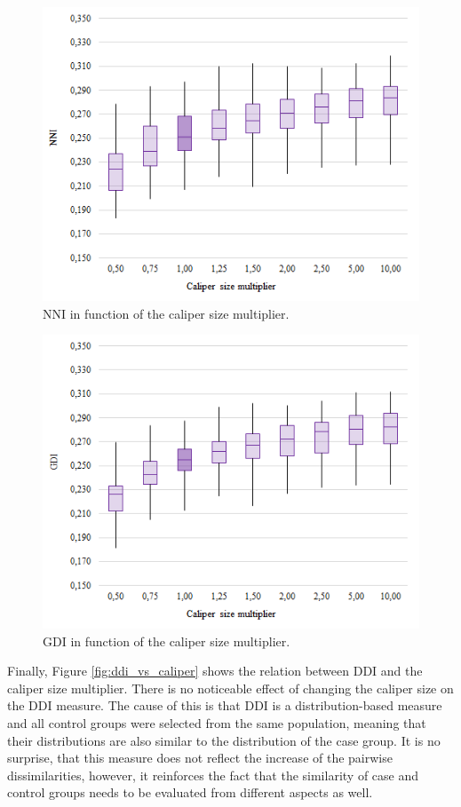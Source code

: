 		\begin{figure}[h]
			\centering
			\captionsetup{justification=centering}
			\includegraphics[width=0.6\linewidth]{assets/figures/control_group_selection/measures/nni_vs_caliper.png}
			\caption{NNI in function of the caliper size multiplier.}
			\label{fig:nni_vs_caliper}
		\end{figure}
										
		\begin{figure}[h]
			\centering
			\captionsetup{justification=centering}
			\includegraphics[width=0.6\linewidth]{assets/figures/control_group_selection/measures/gdi_vs_caliper.png}
			\caption{GDI in function of the caliper size multiplier.}
			\label{fig:gdi_vs_caliper}
		\end{figure}
											
		Finally, Figure \ref{fig:ddi_vs_caliper} shows the relation between DDI and the caliper size multiplier. There is no noticeable effect of changing the caliper size on the DDI measure. The cause of this is that DDI is a distribution-based measure and all control groups were selected from the same population, meaning that their distributions are also similar to the distribution of the case group. It is no surprise, that this measure does not reflect the increase of the pairwise dissimilarities, however, it reinforces the fact that the similarity of case and control groups needs to be evaluated from different aspects as well.
								
